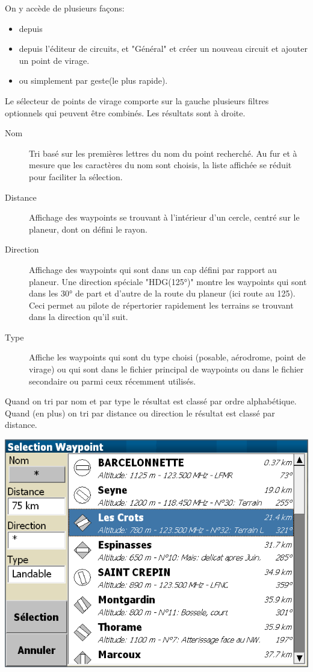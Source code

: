 On y accède de plusieurs façons:
\begin{itemize}
\item depuis  \blink{}
\item depuis l'éditeur de circuits,  \blink{} et "Général" et créer un nouveau circuit et ajouter un point de virage.
\item ou simplement par geste(le plus rapide).
\end{itemize}

Le sélecteur de points de virage comporte sur la gauche plusieurs filtres optionnels qui peuvent être combinés. Les résultats sont à droite. 
\begin{description}
\item[Nom] Tri basé sur les premières lettres du nom du point recherché. Au fur et à mesure que les caractères du nom sont choisis, la liste affichée se réduit pour faciliter la sélection.\\
\item[Distance] Affichage des waypoints se trouvant à l'intérieur d'un cercle, centré sur le planeur, dont on défini le rayon.\\
\item[Direction] Affichage des waypoints qui sont dans un cap défini par rapport au planeur.
 Une direction spéciale "HDG(125°)" montre les waypoints qui sont dans les 30° de part et d'autre de la route du planeur (ici route au 125). Ceci permet au pilote de répertorier rapidement les terrains se trouvant dans la direction qu'il suit.\\
\item[Type] Affiche les waypoints qui sont du type choisi (posable, aérodrome, point de virage) ou qui sont dans le fichier principal de waypoints ou dans le fichier secondaire ou parmi ceux récemment utilisés.\\
\end{description}
Quand on tri par nom et par type le résultat est classé par ordre alphabétique. Quand (en plus) on tri par distance ou direction le résultat est classé par distance.

\begin{center}
\includegraphics[angle=0,width=0.8\linewidth,keepaspectratio='true']{figures/dialog-waypointselect.png}
\end{center}

